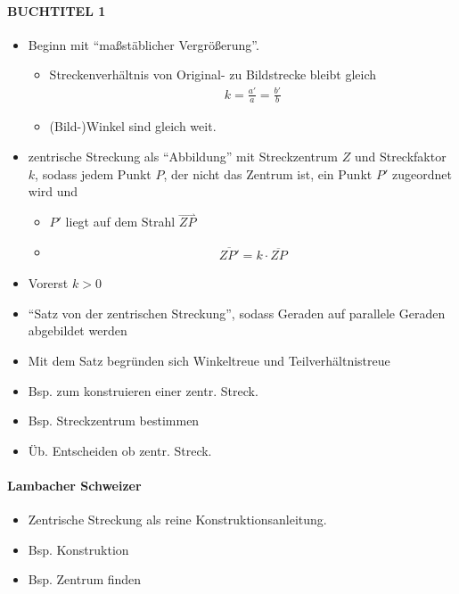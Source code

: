 \documentclass[11pt]{article}
\newcommand{\ray}[1]{\stackrel{\rightharpoonup}{#1}}
\let\marginpar\marginnote
\begin{document}
\paragraph{BUCHTITEL 1}
\begin{itemize}
	\item Beginn mit \enquote{maßstäblicher Vergrößerung}.
	\begin{itemize}
		\item Streckenverhältnis von Original- zu Bildstrecke bleibt gleich
		\begin{equation*}
		\begin{aligned}
		k = \frac{a'}{a} = \frac{b'}{b}
		\end{aligned}
		\end{equation*}
		\item (Bild-)Winkel sind gleich weit.
	\end{itemize}
	\item zentrische Streckung als \enquote{Abbildung} mit Streckzentrum $ Z $ und Streckfaktor $ k $, sodass jedem Punkt $ P $, der nicht das Zentrum ist, ein Punkt $ P' $ zugeordnet wird und
	\begin{itemize}
		\item $ P' $ liegt auf dem Strahl $ \ray{ZP} $
		\item \begin{equation*}
		\begin{aligned}
		\overline{ZP'} = k \cdot \overline{ZP}
		\end{aligned}
		\end{equation*}
	\end{itemize}
	\item Vorerst $ k > 0 $
	\item \enquote{Satz von der zentrischen Streckung}, sodass Geraden auf parallele Geraden abgebildet werden
	\item Mit dem Satz begründen sich Winkeltreue und Teilverhältnistreue
	\item Bsp. zum konstruieren einer zentr. Streck.
	\item Bsp. Streckzentrum bestimmen
	\item Üb. Entscheiden ob zentr. Streck.
\end{itemize}
\paragraph{Lambacher Schweizer}
\begin{itemize}
	\item Zentrische Streckung als reine Konstruktionsanleitung. \marginpar{Mache dies, dann das}
	\item Bsp. Konstruktion
	\item Bsp. Zentrum finden
\end{itemize}
\end{document}
